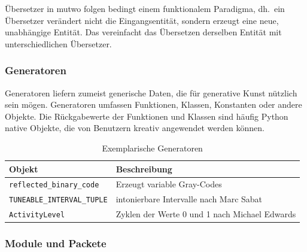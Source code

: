 \documentclass[12pt,a4paper,ngerman]{article}
\begin{document}
Übersetzer in mutwo folgen bedingt einem funktionalem Paradigma, dh.\ ein Übersetzer verändert nicht die Eingangsentität, sondern erzeugt eine neue, unabhängige Entität.
Das vereinfacht das Übersetzen derselben Entität mit unterschiedlichen Übersetzer.

\subsubsection{Generatoren}

Generatoren liefern zumeist generische Daten, die für generative Kunst nützlich sein mögen.
Generatoren umfassen Funktionen, Klassen, Konstanten oder andere Objekte.
Die Rückgabewerte der Funktionen und Klassen sind häufig Python native Objekte, die von Benutzern kreativ angewendet werden können.

\begin{table}[h!]
    \begin{center}
        \begin{tabular}{l l} 
            \hline
            Objekt & Beschreibung \\ [0.5ex] 
            \hline\hline
            \texttt{reflected\_binary\_code} & Erzeugt variable Gray-Codes \\
            \texttt{TUNEABLE\_INTERVAL\_TUPLE} & intonierbare Intervalle nach Marc Sabat \\
            \texttt{ActivityLevel} & Zyklen der Werte 0 und 1 nach Michael Edwards \\ [1ex] 
            \hline
        \end{tabular}
    \end{center}

    \caption{Exemplarische Generatoren}
\end{table}

\subsubsection{Module und Packete}
\end{document}
